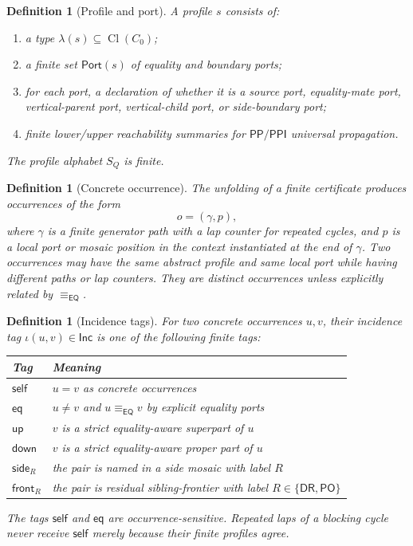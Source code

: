 \documentclass[11pt]{article}
\newtheorem{definition}[theorem]{Definition}
\newcommand{\Cl}{\operatorname{Cl}}
\newcommand{\EQ}{\mathsf{EQ}}
\newcommand{\PP}{\mathsf{PP}}
\newcommand{\PPI}{\mathsf{PPI}}
\newcommand{\PO}{\mathsf{PO}}
\newcommand{\DR}{\mathsf{DR}}
\newcommand{\Port}{\mathsf{Port}}
\newcommand{\eqc}{\equiv_{\EQ}}
\newcommand{\Inc}{\mathsf{Inc}}
\newcommand{\self}{\mathsf{self}}
\newcommand{\eqtag}{\mathsf{eq}}
\newcommand{\up}{\mathsf{up}}
\newcommand{\down}{\mathsf{down}}
\newcommand{\side}{\mathsf{side}}
\newcommand{\front}{\mathsf{front}}
\begin{document}
\begin{definition}[Profile and port]
A profile \(s\) consists of:
\begin{enumerate}[label=(P\arabic*)]
\item a type \(\lambda(s)\subseteq\Cl(C_0)\);
\item a finite set \(\Port(s)\) of equality and boundary ports;
\item for each port, a declaration of whether it is a source port, equality-mate port, vertical-parent port, vertical-child port, or side-boundary port;
\item finite lower/upper reachability summaries for \(\PP/\PPI\) universal propagation.
\end{enumerate}
The profile alphabet \(S_Q\) is finite.
\end{definition}

\begin{definition}[Concrete occurrence]
The unfolding of a finite certificate produces occurrences of the form
\[
  o=(\gamma,p),
\]
where \(\gamma\) is a finite generator path with a lap counter for repeated cycles, and \(p\) is a local port or mosaic position in the context instantiated at the end of \(\gamma\).  Two occurrences may have the same abstract profile and same local port while having different paths or lap counters.  They are distinct occurrences unless explicitly related by \(\eqc\).
\end{definition}

\begin{definition}[Incidence tags]
For two concrete occurrences \(u,v\), their incidence tag \(\iota(u,v)\in\Inc\) is one of the following finite tags:
\begin{center}
\begin{tabular}{ll}
\toprule
Tag & Meaning \\
\midrule
\(\self\) & \(u=v\) as concrete occurrences \\
\(\eqtag\) & \(u\ne v\) and \(u\eqc v\) by explicit equality ports \\
\(\up\) & \(v\) is a strict equality-aware superpart of \(u\) \\
\(\down\) & \(v\) is a strict equality-aware proper part of \(u\) \\
\(\side_R\) & the pair is named in a side mosaic with label \(R\) \\
\(\front_R\) & the pair is residual sibling-frontier with label \(R\in\{\DR,\PO\}\) \\
\bottomrule
\end{tabular}
\end{center}
The tags \(\self\) and \(\eqtag\) are occurrence-sensitive.  Repeated laps of a blocking cycle never receive \(\self\) merely because their finite profiles agree.
\end{definition}
\end{document}
